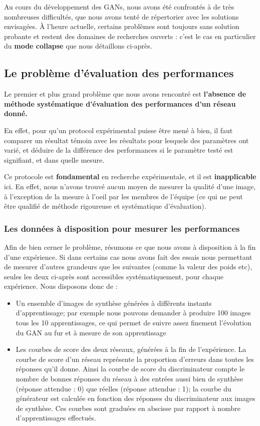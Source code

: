 Au cours du développement des GANs, nous avons été confrontés à de très nombreuses difficultés, que nous avons tenté de répertorier avec les solutions envisagées. À l'heure actuelle, certains problèmes sont toujours sans solution probante et restent des domaines de recherches ouverts : c'est le cas en particulier du \textbf{mode collapse} que nous détaillons ci-après.

\subsection{Le problème d'évaluation des performances}

Le premier et plus grand problème que nous avons rencontré est \textbf{l'absence de méthode systématique d'évaluation des performances d'un réseau donné.}

En effet, pour qu'un protocol expérimental puisse être mené à bien, il faut comparer un résultat témoin avec les résultats pour lesquels des paramètres ont varié, et déduire de la différence des performances si le paramètre testé est signifiant, et dans quelle mesure.

Ce protocole est \textbf{fondamental} en recherche expérimentale, et il est \textbf{inapplicable} ici. En effet, nous n'avons trouvé aucun moyen de mesurer la qualité d'une image, à l'exception de la mesure à l'oeil par les membres de l'équipe (ce qui ne peut être qualifié de méthode rigoureuse et systématique d'évaluation). 

\subsubsection{Les données à disposition pour mesurer les performances}

Afin de bien cerner le problème, résumons ce que nous avons à disposition à la fin d'une expérience. Si dans certains cas nous avons fait des essais nous permettant de mesurer d'autres grandeurs que les suivantes (comme la valeur des poids etc), seules les deux ci-après sont accessibles systématiquement, pour chaque expérience.
Nous disposons donc de :

\begin{itemize}
  \item Un ensemble d'images de synthèse générées à différents instants d'apprentissage; par exemple nous pouvons demander à produire 100 images tous les 10 apprentissages, ce qui permet de suivre assez finement l'évolution du GAN au fur et à mesure de son apprentissage
  \item Les courbes de score des deux réseaux, générées à la fin de l'expérience. La courbe de score d'un réseau représente la proportion d'erreurs dans toutes les réponses qu'il donne. Ainsi la courbe de score du discriminateur compte le nombre de bonnes réponses du réseau à des entrées aussi bien de synthèse (réponse attendue : 0) que réelles (réponse attendue : 1); la courbe du générateur est calculée en fonction des réponses du discriminateur aux images de synthèse. Ces courbes sont graduées en abscisse par rapport à nombre d'apprentissages effectués.
\end{itemize}

